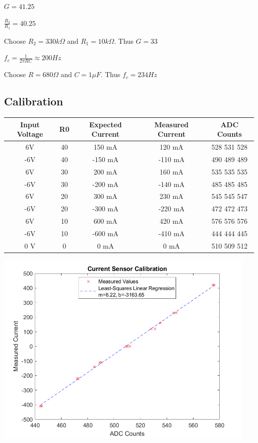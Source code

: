\documentclass[12pt]{article}
\begin{document}
$G = 41.25$

$\frac{R_2}{R_1} = 40.25$

Choose $R_2 = 330 k\Omega$ and $R_1 = 10 k\Omega$.
Thus $G = 33$

$f_c = \frac{1}{2 \pi RC} \approx 200 Hz$

Choose $R = 680 \Omega$ and $C = 1 \mu F$.
Thus $f_c = 234 Hz$


\subsection*{Calibration}
\begin{center}
\begin{tabular}{|c|c|c|c|c|}
    \hline
    Input Voltage & R0 & Expected Current & Measured Current & ADC Counts \\
    \hline
    6V & 40 & 150 mA & 120 mA & 528 531 528 \\
    \hline
    -6V & 40 & -150 mA & -110 mA & 490 489 489\\
    \hline
    6V & 30 & 200 mA & 160 mA & 535 535 535 \\
    \hline
    -6V & 30 & -200 mA & -140 mA & 485 485 485 \\
    \hline
    6V & 20 & 300 mA & 230 mA & 545 545 547 \\
    \hline
    -6V & 20 & -300 mA & -220 mA & 472 472 473 \\
    \hline
    6V & 10 & 600 mA & 420 mA & 576 576 576 \\
    \hline
    -6V & 10 & -600 mA & -410 mA & 444 444 445 \\
    \hline
    0 V & 0 & 0 mA & 0 mA & 510 509 512 \\
    \hline
\end{tabular}
\end{center}

\begin{center}
    \includegraphics[width=5in]{current_sensor_calibration_curve.png}
\end{center}
\end{document}
